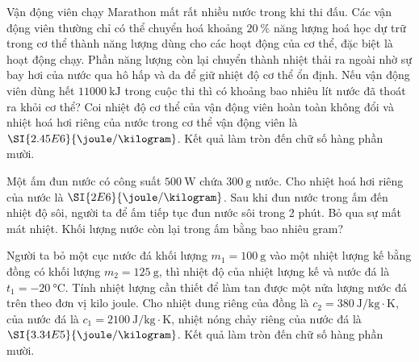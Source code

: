\begin{ex}
	Vận động viên chạy Marathon mất rất nhiều nước trong khi thi đấu. Các vận động viên thường chỉ có thể chuyển hoá khoảng $\SI{20}{\percent}$ năng lượng hoá học dự trữ trong cơ thể thành năng lượng dùng cho các hoạt động của cơ thể, đặc biệt là hoạt động chạy. Phần năng lượng còn lại chuyển thành nhiệt thải ra ngoài nhờ sự bay hơi của nước qua hô hấp và da để giữ nhiệt độ cơ thể ổn định. Nếu vận động viên dùng hết $\SI{11000}{\kilo\joule}$ trong cuộc thi thì có khoảng bao nhiêu lít nước đã thoát ra khỏi cơ thể? Coi nhiệt độ cơ thể của vận động viên hoàn toàn không đổi và nhiệt hoá hơi riêng của nước trong cơ thể vận động viên là $\SI{2.45E6}{\joule/\kilogram}$. Kết quả làm tròn đến chữ số hàng phần mười.
	\end{ex}

\begin{ex}
Một ấm đun nước có công suất $\SI{500}{\watt}$ chứa $\SI{300}{\gram}$ nước. Cho nhiệt hoá hơi riêng của nước là $\SI{2E6}{\joule/\kilogram}$. Sau khi đun nước trong ấm đến nhiệt độ sôi, người ta để ấm tiếp tục đun nước sôi trong 2 phút. Bỏ qua sự mất mát nhiệt. Khối lượng nước còn lại trong ấm bằng bao nhiêu gram?
\end{ex}
\begin{ex}
		Người ta bỏ một cục nước đá khối lượng $m_1=\SI{100}{\gram}$ vào một nhiệt lượng kế bằng đồng có khối lượng $m_2=\SI{125}{\gram}$, thì nhiệt độ của nhiệt lượng kế và nước đá là $t_1=\SI{-20}{\celsius}$. Tính nhiệt lượng cần thiết để làm tan được một nửa lượng nước đá trên theo đơn vị kilo joule. Cho nhiệt dung riêng của đồng là $c_2=\SI{380}{\joule/\kilogram\cdot\kelvin}$, của nước đá là $c_1=\SI{2100}{\joule/\kilogram\cdot\kelvin}$, nhiệt nóng chảy riêng của nước đá là $\SI{3.34E5}{\joule/\kilogram}$. Kết quả làm tròn đến chữ số hàng phần mười.
\end{ex}

